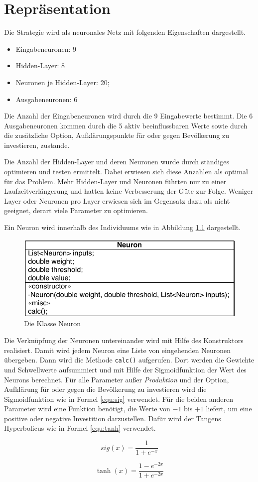 \chapter{Repräsentation}
Die Strategie wird als neuronales Netz mit folgenden Eigenschaften dargestellt.
\begin{itemize}
\item Eingabeneuronen: 9
\item Hidden-Layer: 8
\item Neuronen je Hidden-Layer: 20;
\item Ausgabeneuronen: 6
\end{itemize}

Die Anzahl der Eingabeneuronen wird durch die 9 Eingabewerte bestimmt. Die 6 Ausgabeneuronen kommen durch die 5 aktiv beeinflussbaren Werte sowie durch die zusätzliche Option, Aufklärungspunkte für oder gegen Bevölkerung zu investieren, zustande.

Die Anzahl der Hidden-Layer und deren Neuronen wurde durch ständiges optimieren und testen ermittelt. Dabei erwiesen sich diese Anzahlen als optimal für das Problem. Mehr Hidden-Layer und Neuronen führten nur zu einer Laufzeitverlängerung und hatten keine Verbesserung der Güte zur Folge. Weniger Layer oder Neuronen pro Layer erwiesen sich im Gegensatz dazu als nicht geeignet, derart viele Parameter zu optimieren.

Ein Neuron wird innerhalb des Individuums wie in Abbildung \ref{fig:neuron} dargestellt.

\begin{figure}[tbph]
\centering
\includegraphics[width=0.5\linewidth]{pics/neuron}
\caption[Die Klasse Neuron]{Die Klasse Neuron}
\label{fig:neuron}
\end{figure}

Die Verknüpfung der Neuronen untereinander wird mit Hilfe des Konstruktors realisiert. Damit wird jedem Neuron eine Liste von eingehenden Neuronen übergeben. Dann wird die Methode \verb+calc()+ aufgerufen. Dort werden die Gewichte und Schwellwerte aufsummiert und mit Hilfe der Sigmoidfunktion der Wert des Neurons berechnet. Für alle Parameter außer \emph{Produktion} und der Option, Aufklärung für oder gegen die Bevölkerung zu investieren wird die Sigmoidfunktion wie in Formel \ref{equ:sig} verwendet. Für die beiden anderen Parameter wird eine Funktion benötigt, die Werte von $ -1 $ bis $ +1 $ liefert, um eine positive oder negative Investition darzustellen. Dafür wird der Tangens Hyperbolicus wie in Formel \ref{equ:tanh} verwendet.

\begin{equation}
\label{equ:sig}
sig(x) = \dfrac{1}{1+ e^{-x}}
\end{equation}

\begin{equation}
\label{equ:tanh}
\tanh(x) = \dfrac{1- e^{-2x}}{1+ e^{-2x}}
\end{equation}
